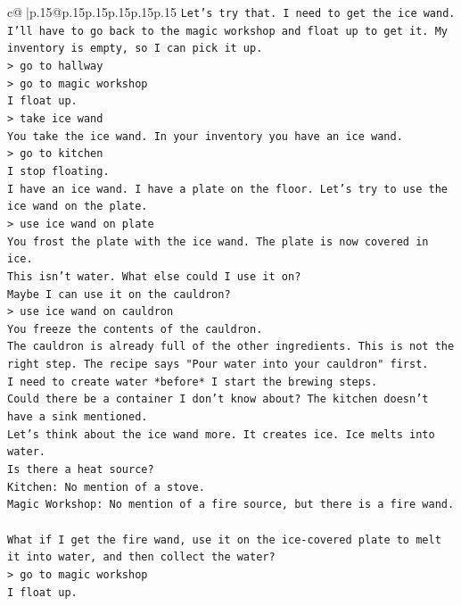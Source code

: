 \documentclass{article}
\begin{document}
{\begin{supertabular}{c@{$\;$}|p{.15\linewidth}@{}p{.15\linewidth}p{.15\linewidth}p{.15\linewidth}p{.15\linewidth}p{.15\linewidth}}
{{{\texttt{Let's try that. I need to get the ice wand. I'll have to go back to the magic workshop and float up to get it. My inventory is empty, so I can pick it up.} \\
\texttt{> go to hallway} \\
\texttt{> go to magic workshop} \\
\texttt{I float up.} \\
\texttt{> take ice wand} \\
\texttt{You take the ice wand. In your inventory you have an ice wand.} \\
\texttt{> go to kitchen} \\
\texttt{I stop floating.} \\
\texttt{I have an ice wand. I have a plate on the floor. Let's try to use the ice wand on the plate.} \\
\texttt{> use ice wand on plate} \\
\texttt{You frost the plate with the ice wand. The plate is now covered in ice.} \\
\texttt{This isn't water. What else could I use it on?} \\
\texttt{Maybe I can use it on the cauldron?} \\
\texttt{> use ice wand on cauldron} \\
\texttt{You freeze the contents of the cauldron.} \\
\texttt{The cauldron is already full of the other ingredients. This is not the right step. The recipe says "Pour water into your cauldron" first.} \\
\texttt{I need to create water *before* I start the brewing steps.} \\
\texttt{Could there be a container I don't know about? The kitchen doesn't have a sink mentioned.} \\
\texttt{Let's think about the ice wand more. It creates ice. Ice melts into water.} \\
\texttt{Is there a heat source?} \\
\texttt{Kitchen: No mention of a stove.} \\
\texttt{Magic Workshop: No mention of a fire source, but there is a fire wand.} \\
\\ 
\texttt{What if I get the fire wand, use it on the ice{-}covered plate to melt it into water, and then collect the water?} \\
\texttt{> go to magic workshop} \\
\texttt{I float up.} \\
}}}
\end{supertabular}}
\end{document}
